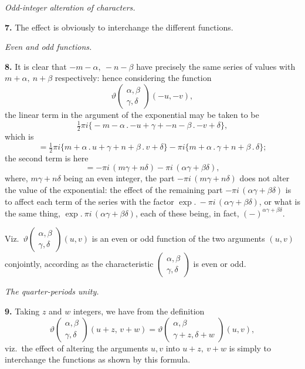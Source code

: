 \documentclass[11pt]{article}
\begin{document}
\medskip

\textit{Odd-integer alteration of characters.}

\medskip

\textbf{7.} The effect is obviously to interchange the different functions.

\medskip

\textit{Even and odd functions.}

\medskip

\textbf{8.} It is clear that $-m - \alpha,\ -n - \beta$ have precisely the same series of values with $m + \alpha,\ n + \beta$ respectively: hence considering the function
\[
\vartheta\!\begin{pmatrix} \alpha,\beta \\ \gamma,\delta \end{pmatrix}\!(-u, -v),
\]
the linear term in the argument of the exponential may be taken to be
\[
\tfrac{1}{2}\pi i\bigl\{-m - \alpha\mathbin{.}-u + \gamma + -n - \beta\mathbin{.}-v + \delta\bigr\},
\]
which is
\[
= \tfrac{1}{2}\pi i\bigl\{m + \alpha\mathbin{.}u + \gamma + n + \beta\mathbin{.}v + \delta\bigr\} - \pi i\bigl\{m + \alpha\mathbin{.}\gamma + n + \beta\mathbin{.}\delta\bigr\};
\]
the second term is here
\[
= -\pi i\,(m\gamma + n\delta) - \pi i\,(\alpha\gamma + \beta\delta),
\]
where, $m\gamma + n\delta$ being an even integer, the part $-\pi i\,(m\gamma + n\delta)$ does not alter the value of the exponential: the effect of the remaining part $-\pi i\,(\alpha\gamma + \beta\delta)$ is to affect each term of the series with the factor $\exp.\ -\pi i\,(\alpha\gamma + \beta\delta)$, or what is the same thing, $\exp.\ \pi i\,(\alpha\gamma + \beta\delta)$, each of these being, in fact, $(-)^{\alpha\gamma + \beta\delta}$.

\medskip

Viz.\ $\vartheta\!\begin{pmatrix} \alpha,\beta \\ \gamma,\delta \end{pmatrix}\!(u,v)$ is an even or odd function of the two arguments $(u,v)$ conjointly, according as the characteristic $\begin{pmatrix} \alpha,\beta \\ \gamma,\delta \end{pmatrix}$ is even or odd.

\medskip

\textit{The quarter-periods unity.}

\medskip

\textbf{9.} Taking $z$ and $w$ integers, we have from the definition
\[
\vartheta\!\begin{pmatrix} \alpha,\beta \\ \gamma,\delta \end{pmatrix}\!(u + z,\, v + w) = \vartheta\!\begin{pmatrix} \alpha,\beta \\ \gamma + z,\delta + w \end{pmatrix}\!(u,v),
\]
viz.\ the effect of altering the arguments $u,v$ into $u + z,\ v + w$ is simply to interchange the functions as shown by this formula.
\end{document}
